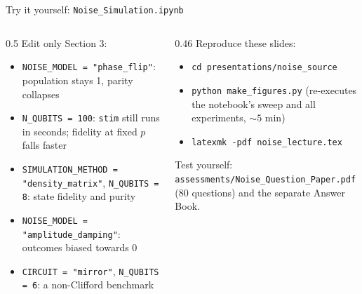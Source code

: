 \documentclass[aspectratio=169,11pt]{beamer}
\begin{document}
\begin{frame}[label=fTry]{Try it yourself: \texttt{Noise\_Simulation.ipynb}}
  \begin{columns}[T]
    \begin{column}{0.5\textwidth}
      \small Edit only Section 3:
      \begin{itemize}\itemsep1pt\scriptsize
        \item \texttt{NOISE\_MODEL = "phase\_flip"}: population stays 1, parity collapses
        \item \texttt{N\_QUBITS = 100}: \texttt{stim} still runs in seconds; fidelity at fixed $p$ falls faster
        \item \texttt{SIMULATION\_METHOD = "density\_matrix"}, \texttt{N\_QUBITS = 8}: state fidelity and purity
        \item \texttt{NOISE\_MODEL = "amplitude\_damping"}: outcomes biased towards 0
        \item \texttt{CIRCUIT = "mirror"}, \texttt{N\_QUBITS = 6}: a non-Clifford benchmark
      \end{itemize}
    \end{column}
    \begin{column}{0.46\textwidth}
      \small Reproduce these slides:
      \begin{itemize}\itemsep1pt\scriptsize
        \item \texttt{cd presentations/noise\_source}
        \item \texttt{python make\_figures.py} (re-executes the notebook's sweep and all experiments, $\sim5$ min)
        \item \texttt{latexmk -pdf noise\_lecture.tex}
      \end{itemize}
      Test yourself: \texttt{assessments/Noise\_Question\_Paper.pdf} (80 questions) and the separate Answer Book.
    \end{column}
  \end{columns}
\end{frame}

\end{document}

